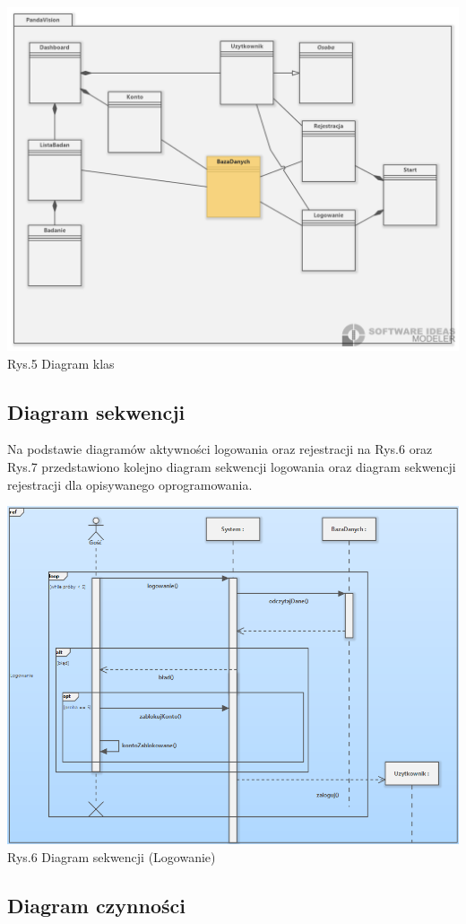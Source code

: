 \documentclass[12pt, letterpaper]{article}
\begin{document}
		\begin{center}
			\includegraphics[scale=0.5]{classDiagram}\\
			\caption{Rys.5 Diagram klas}
		\end{center}
		
		
		\newpage

		\subsection{Diagram sekwencji}
		
		Na podstawie diagramów aktywności logowania oraz rejestracji na Rys.6 oraz Rys.7 przedstawiono kolejno diagram sekwencji logowania oraz diagram sekwencji rejestracji dla opisywanego oprogramowania.
		
		\begin{center}
			\includegraphics[scale=0.6]{seqDiagram}\\
			\caption{Rys.6 Diagram sekwencji (Logowanie)}
		\end{center}
		
		\subsection{Diagram czynności}


 
\end{document}
